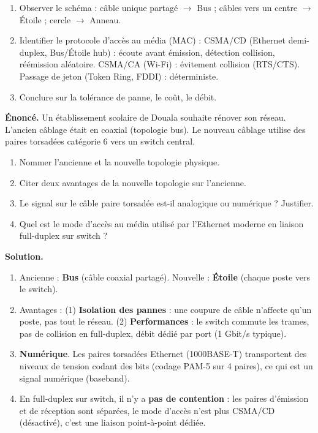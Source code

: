 \documentclass[11pt]{article}
\newcommand{\cle}[1]{{\popxbold\color{popdark}#1}}
\begin{document}
\begin{methode}
\begin{enumerate}
\item Observer le schéma : câble unique partagé $\rightarrow$ Bus ; câbles vers un centre $\rightarrow$ Étoile ; cercle $\rightarrow$ Anneau.
\item Identifier le protocole d'accès au média (MAC) : \cle{CSMA/CD} (Ethernet demi-duplex, Bus/Étoile hub) : écoute avant émission, détection collision, réémission aléatoire. \cle{CSMA/CA} (Wi-Fi) : évitement collision (RTS/CTS). \cle{Passage de jeton} (Token Ring, FDDI) : déterministe.
\item Conclure sur la tolérance de panne, le coût, le débit.
\end{enumerate}
\end{methode}

\begin{exoresolu}
\textbf{Énoncé.} Un établissement scolaire de Douala souhaite rénover son réseau. L'ancien câblage était en coaxial (topologie bus). Le nouveau câblage utilise des paires torsadées catégorie 6 vers un switch central.
\begin{enumerate}
\item Nommer l'ancienne et la nouvelle topologie physique.
\item Citer deux avantages de la nouvelle topologie sur l'ancienne.
\item Le signal sur le câble paire torsadée est-il analogique ou numérique ? Justifier.
\item Quel est le mode d'accès au média utilisé par l'Ethernet moderne en liaison full-duplex sur switch ?
\end{enumerate}
\tcblower
\textbf{Solution.}
\begin{enumerate}
\item Ancienne : \textbf{Bus} (câble coaxial partagé). Nouvelle : \textbf{Étoile} (chaque poste vers le switch).
\item Avantages : (1) \textbf{Isolation des pannes} : une coupure de câble n'affecte qu'un poste, pas tout le réseau. (2) \textbf{Performances} : le switch commute les trames, pas de collision en full-duplex, débit dédié par port (1 Gbit/s typique).
\item \textbf{Numérique}. Les paires torsadées Ethernet (1000BASE-T) transportent des niveaux de tension codant des bits (codage PAM-5 sur 4 paires), ce qui est un signal numérique (baseband).
\item En full-duplex sur switch, il n'y a \textbf{pas de contention} : les paires d'émission et de réception sont séparées, le mode d'accès n'est plus CSMA/CD (désactivé), c'est une liaison point-à-point dédiée.
\end{enumerate}
\end{exoresolu}
\end{document}

